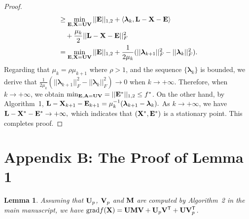 \documentclass[letterpaper]{article}
\newtheorem{lemma}{Lemma}
\def\U{{\bf U}}
\def\V{{\bf V}}
\def\trsp{{\sf T}}
\def\bA{{\bf A}}
\def\bM{{\bf M}}
\def\bE{{\bf E}}
\def\blambda{{\bm \lambda}}
\def\bL{{\bf L}}
\def\bU{{\bf U}}
\def\bV{{\bf V}}
\def\bX{{\bf X}}
\def\bA{{\bf A}}
\def\bX{{\bf X}}
\begin{document}
\begin{proof}
\begin{align}
          & \geq \min_{\bE, \bX = \bU \bV} || \bE ||_{1,2} + \langle \blambda_k, \bL - \bX - \bE \rangle \nonumber \\
          & \quad + \frac{\mu_k}{2} ||  \bL - \bX - \bE ||_F^2     \nonumber \\
          & = \min_{\bE, \bX = \bU \bV} || \bE ||_{1,2} + \frac{1}{2\mu_k} (|| \blambda_{k+1} ||_F^2 - || \blambda_{k} ||_F^2)   .
    \end{align}
    \indent
    Regarding that $\mu_{k} = \rho \mu_{k+1}$ where $\rho > 1$, and the sequence $\{ \blambda_k \}$ is bounded, we derive that
    $\frac{1}{2\mu_k} (|| \blambda_{k+1} ||_F^2 - || \blambda_{k} ||_F^2) \rightarrow 0$ when $k \rightarrow +\infty .$
    Therefore, when $k \rightarrow +\infty$, we obtain $\min_{\bE, \bA = \bU \bV} = || \bE^* ||_{1,2} \leq f^*$.
    On the other hand, by Algorithm~1, $\bL - \bX_{k+1} - \bE_{k+1} = \mu_k^{-1} (\blambda_{k+1} - \blambda_{k}) .$
    As $k \rightarrow +\infty$, we have $\bL - \bX^* - \bE^* \rightarrow +\infty  ,$
    which indicates that $(\bX^*, \bE^*)$ is a stationary point.
    This completes proof.
\end{proof}





\section{Appendix B: The Proof of Lemma 1}

\begin{lemma}
  Assuming that $\U_{p}$, $\V_{p}$ and $\bM$ are computed by Algorithm~2 in the main manuscript,
  we have ${\textnormal{grad}} f(\bX) = \U \bM \V + \U_{p} \V^{\trsp} + \U \V^{\trsp}_{p}$.
\end{lemma}
\end{document}
